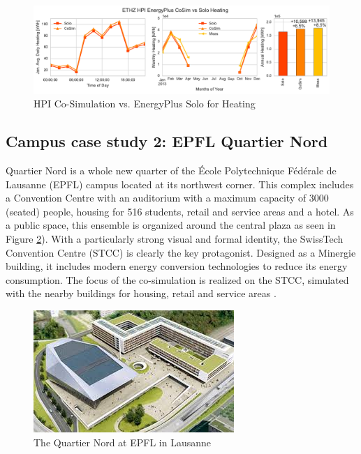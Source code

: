 \documentclass{tBPS2e}
\theoremstyle{plain}
\theoremstyle{definition}
\theoremstyle{remark}
\begin{document}
\begin{figure}[H]
\centering
\includegraphics[scale=0.55]{figures/HPI_EnergyPlus_Heating}
\caption{HPI Co-Simulation vs. EnergyPlus Solo for Heating}
\label{fig:hpi_energyplusheating}
\end{figure}


\subsection{Campus case study 2: EPFL Quartier Nord} 
Quartier Nord is a whole new quarter of the École Polytechnique Fédérale de
Lausanne (EPFL) campus located at its northwest corner. This complex includes
a Convention Centre with an auditorium with a maximum capacity of 3000
(seated) people, housing for 516 students, retail and service areas and a
hotel. As a public space, this ensemble is organized around the central plaza as
seen in Figure \ref{fig:quartier_nord_1}). With a particularly strong visual and formal identity, the SwissTech
Convention Centre (STCC) is clearly the key protagonist.  Designed as a
Minergie building, it includes modern energy conversion
technologies to reduce its energy consumption. The focus of the co-simulation
is realized on the STCC, simulated with the nearby buildings for housing,
retail and service areas \citep{beyeler_minergie:_2009}.

\begin{figure}[H]
\centering
\includegraphics[]{figures/quartier_nord_1}
\caption{The Quartier Nord at EPFL in Lausanne}
\label{fig:quartier_nord_1}
\end{figure}
\end{document}
